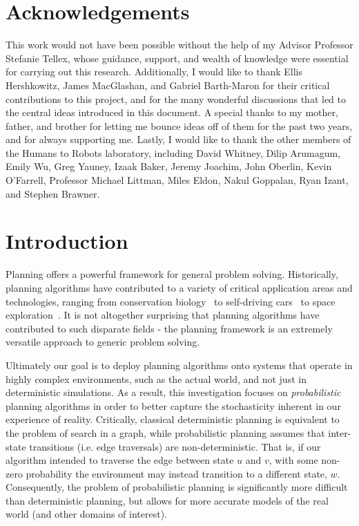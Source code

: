 \documentclass[11pt]{article}
\begin{document}
\newpage

\section*{Acknowledgements}
This work would not have been possible without the help of my Advisor Professor Stefanie Tellex, whose guidance, support, and wealth of knowledge were essential for carrying out this research. Additionally, I would like to thank Ellis Hershkowitz, James MacGlashan, and Gabriel Barth-Maron for their critical contributions to this project, and for the many wonderful discussions that led to the central ideas introduced in this document. A special thanks to my mother, father, and brother for letting me bounce ideas off of them for the past two years, and for always supporting me. Lastly, I would like to thank the other members of the Humans to Robots laboratory, including David Whitney, Dilip Arumagum, Emily Wu, Greg Yauney, Izaak Baker, Jeremy Joachim, John Oberlin, Kevin O'Farrell, Professor Michael Littman, Miles Eldon, Nakul Goppalan, Ryan Izant, and Stephen Brawner.

\newpage
\tableofcontents
\newpage

\section{Introduction}
\label{sec:introduction}

Planning offers a powerful framework for general problem solving. Historically, planning algorithms have contributed to a variety of critical application areas and technologies, ranging from conservation biology~\cite{possingham1997state} to self-driving cars~\cite{thrun2006stanley,montemerlo2008junior} to space exploration~\cite{bresina2005activity,backes1999automated,chien2000aspen}. It is not altogether surprising that planning algorithms have contributed to such disparate fields - the planning framework is an extremely versatile approach to generic problem solving.

Ultimately our goal is to deploy planning algorithms onto systems that operate in highly complex environments, such as the actual world, and not just in deterministic simulations. As a result, this investigation focuses on {\it probabilistic} planning algorithms in order to better capture the stochasticity inherent in our experience of reality. Critically, classical deterministic planning is equivalent to the problem of search in a graph, while probabilistic planning assumes that inter-state transitions (i.e. edge traversals) are non-deterministic. That is, if our algorithm intended to traverse the edge between state $u$ and $v$, with some non-zero probability the environment may instead transition to a different state, $w$. Consequently, the problem of probabilistic planning is significantly more difficult than deterministic planning, but allows for more accurate models of the real world (and other domains of interest).
\end{document}
